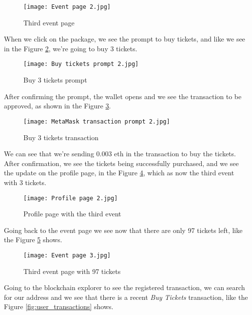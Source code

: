 \begin{figure}[H]
    \texttt{[image: Event page 2.jpg]}
    \centering
    \caption{Third event page}
    \label{fig:buy_tickets_event}
\end{figure}

When we click on the package, we see the prompt to buy tickets, and like we see
in the Figure \ref{fig:buy_tickets_prompt}, we're going to buy 3 tickets.

\begin{figure}[H]
    \texttt{[image: Buy tickets prompt 2.jpg]}
    \centering
    \caption{Buy 3 tickets prompt}
    \label{fig:buy_tickets_prompt}
\end{figure}

After confirming the prompt, the wallet opens and we see the transaction to be
approved, as shown in the Figure \ref{fig:buy_tickets_transaction}.

\begin{figure}[H]
    \texttt{[image: MetaMask transaction prompt 2.jpg]}
    \centering
    \caption{Buy 3 tickets transaction}
    \label{fig:buy_tickets_transaction}
\end{figure}

We can see that we're sending 0.003 eth in the transaction to buy the tickets.
After confirmation, we see the tickets being successfully purchased, and we see
the update on the profile page, in the Figure \ref{fig:profile_page_2}, which
as now the third event with 3 tickets.

\begin{figure}[H]
    \texttt{[image: Profile page 2.jpg]}
    \centering
    \caption{Profile page with the third event}
    \label{fig:profile_page_2}
\end{figure}

Going back to the event page we see now that there are only 97 tickets left,
like the Figure \ref{fig:buy_tickets_event_2} shows.

\begin{figure}[H]
    \texttt{[image: Event page 3.jpg]}
    \centering
    \caption{Third event page with 97 tickets}
    \label{fig:buy_tickets_event_2}
\end{figure}

Going to the blockchain explorer to see the registered transaction, we can
search for our address and we see that there is a recent \textit{Buy Tickets}
transaction, like the Figure \ref{fig:user_transactions} shows.

